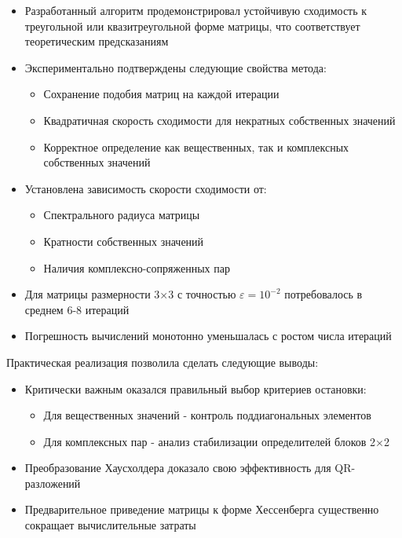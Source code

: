 \begin{itemize}
\item Разработанный алгоритм продемонстрировал устойчивую сходимость к треугольной или квазитреугольной форме матрицы, что соответствует теоретическим предсказаниям

\item Экспериментально подтверждены следующие свойства метода:
\begin{itemize}
\item Сохранение подобия матриц на каждой итерации
\item Квадратичная скорость сходимости для некратных собственных значений
\item Корректное определение как вещественных, так и комплексных собственных значений
\end{itemize}

\item Установлена зависимость скорости сходимости от:
\begin{itemize}
\item Спектрального радиуса матрицы
\item Кратности собственных значений
\item Наличия комплексно-сопряженных пар
\end{itemize}

\item Для матрицы размерности 3×3 с точностью $\varepsilon = 10^{-2}$ потребовалось в среднем 6-8 итераций

\item Погрешность вычислений монотонно уменьшалась с ростом числа итераций
\end{itemize}

Практическая реализация позволила сделать следующие выводы:

\begin{itemize}
\item Критически важным оказался правильный выбор критериев остановки:
\begin{itemize}
\item Для вещественных значений - контроль поддиагональных элементов
\item Для комплексных пар - анализ стабилизации определителей блоков 2×2
\end{itemize}

\item Преобразование Хаусхолдера доказало свою эффективность для QR-разложений

\item Предварительное приведение матрицы к форме Хессенберга существенно сокращает вычислительные затраты
\end{itemize}

